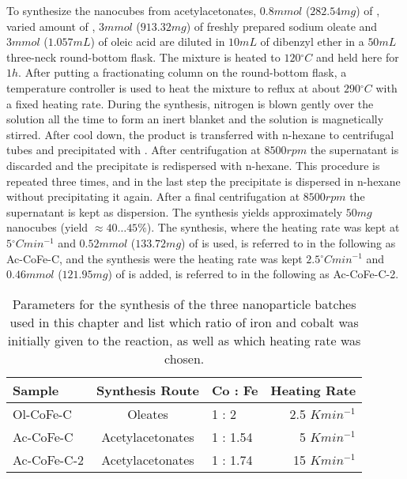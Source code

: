 \documentclass[\main/dresen_thesis.tex]{subfiles}
\begin{document}
    To synthesize the nanocubes from acetylacetonates, $0.8 \unit{mmol}$ ($282.54 \unit{mg}$) of , varied amount of , $3 \unit{mmol}$ ($913.32 \unit{mg}$) of freshly prepared sodium oleate and $3 \unit{mmol}$ ($1.057 \unit{mL}$) of oleic acid are diluted in $10 \unit{mL}$ of dibenzyl ether in a $50 \unit{mL}$ three-neck round-bottom flask.
    The mixture is heated to $120 \unit{^\circ C}$ and held here for $1 \unit{h}$.
    After putting a fractionating column on the round-bottom flask, a temperature controller is used to heat the mixture to reflux at about $290 \unit{^\circ C}$ with a fixed heating rate.
    During the synthesis, nitrogen is blown gently over the solution all the time to form an inert blanket and the solution is magnetically stirred.
    After cool down, the product is transferred with n-hexane to centrifugal tubes and precipitated with .
    After centrifugation at $8500 \unit{rpm}$ the supernatant is discarded and the precipitate is redispersed with n-hexane.
    This procedure is repeated three times, and in the last step the precipitate is dispersed in n-hexane without precipitating it again.
    After a final centrifugation at $8500 \unit{rpm}$ the supernatant is kept as dispersion.
    The synthesis yields approximately $50 \unit{mg}$ nanocubes (yield $\approx 40 
    \ldots 45 \%$).
    The synthesis, where the heating rate was kept at $5 \unit{^\circ C min^{-1}}$ and $0.52 \unit{mmol}$ ($133.72 \unit{mg}$) of   is used, is referred to in the following as Ac-CoFe-C, and the synthesis were the heating rate was kept $2.5 \unit{^\circ C min^{-1}}$ and $0.46 \unit{mmol}$ ($121.95 \unit{mg}$) of  is added, is referred to in the following as Ac-CoFe-C-2.


    \begin{table}[ht]
      \centering
      \caption{\label{tab:monolayers:synthesis:nanoparticles}Parameters for the synthesis of the three nanoparticle batches used in this chapter and list which ratio of iron and cobalt was initially given to the reaction, as well as which heating rate was chosen.}
      \begin{tabular}{ l | c | l | r }
        \textbf{Sample} & \textbf{Synthesis Route} & \textbf{Co : Fe} & \textbf{Heating Rate}\\
        \hline
        Ol-CoFe-C & Oleates & 1 : 2 & 2.5 $\unit{K min^{-1}}$\\
        Ac-CoFe-C & Acetylacetonates & 1 : 1.54 &5 $\unit{K min^{-1}}$\\
        Ac-CoFe-C-2 & Acetylacetonates & 1 : 1.74 &15 $\unit{K min^{-1}}$\\
        \hline
      \end{tabular}
    \end{table}
\end{document}
